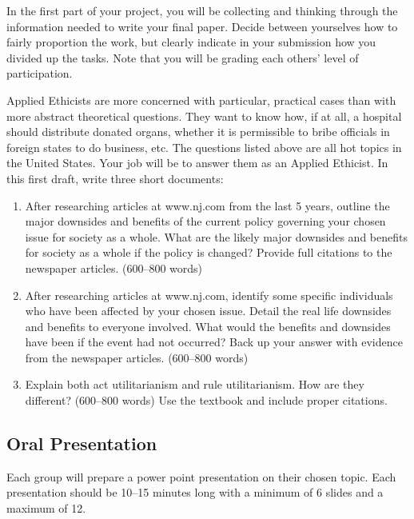\documentclass[10pt]{article}
\providecommand{\tightlist}{%
  \setlength{\itemsep}{0pt}\setlength{\parskip}{0pt}}
\begin{document}
In the first part of your project, you will be collecting and thinking
through the information needed to write your final paper. Decide between
yourselves how to fairly proportion the work, but clearly indicate in
your submission how you divided up the tasks. Note that you will be
grading each others' level of participation.

Applied Ethicists are more concerned with particular, practical cases
than with more abstract theoretical questions. They want to know how, if
at all, a hospital should distribute donated organs, whether it is
permissible to bribe officials in foreign states to do business, etc.
The questions listed above are all hot topics in the United States. Your
job will be to answer them as an Applied Ethicist. In this first draft,
write  three short documents:

\begin{enumerate}
\def\labelenumi{\arabic{enumi}.}
\tightlist
\item
  After researching articles at www.nj.com from the last 5 years,
  outline the major downsides and benefits of the current policy governing your chosen issue for society as a whole. What are the likely major downsides and benefits for society as a whole if the policy is changed? Provide full citations to the newspaper articles. 
  (600--800 words)
\item
 After researching articles at www.nj.com, identify some specific individuals who have been affected by your chosen issue.  Detail the real life downsides and benefits to everyone involved. What would the benefits and downsides have been if the event had not occurred? Back up your answer with evidence from the newspaper articles.    (600--800 words)

\item
  Explain both act utilitarianism and rule utilitarianism. How are they
  different? (600--800 words) Use the textbook and include proper citations.

\end{enumerate}

\subsection{Oral Presentation}\label{oral-presentation}

Each group will prepare a power point presentation on their chosen
topic. Each presentation should be 10--15 minutes long with a minimum of
6 slides and a maximum of 12.
\end{document}

